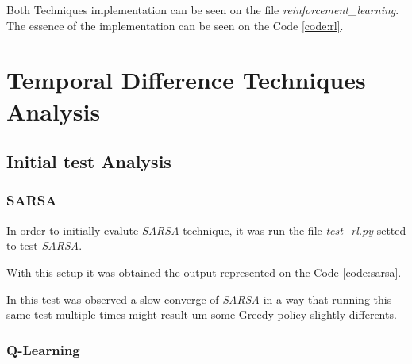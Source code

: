 \documentclass[journal]{IEEEtran}
\begin{document}
Both Techniques implementation can be seen on the file \textit{reinforcement\_learning}. The essence of the implementation can be seen on the Code \ref{code:rl}.



% 

\section{Temporal Difference Techniques Analysis}

\subsection{Initial test Analysis}

\subsubsection{SARSA}

In order to initially evalute \textit{SARSA} technique, it was run the file \textit{test\_rl.py} setted to test \textit{SARSA}.

With this setup it was obtained the output represented on the Code \ref{code:sarsa}.



In this test was observed a slow converge of \textit{SARSA} in a way that running this same test multiple times might result um some Greedy policy slightly differents.

\subsubsection{Q-Learning}
\end{document}
